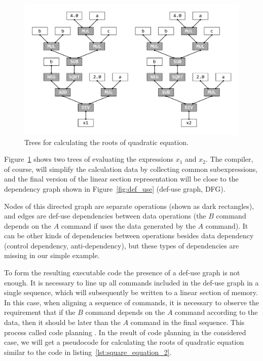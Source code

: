 \documentclass[
11pt,%
tightenlines,%
twoside,%
onecolumn,%
nofloats,%
nobibnotes,%
nofootinbib,%
superscriptaddress,%
noshowpacs,%
centertags]%
{revtex4}
\begin{document}
\begin{figure}[h]
\setcaptionmargin{5mm}
\includegraphics[width=1.05\textwidth]{pics/square_equation_calculation_tree.pdf}
\caption{Trees for calculating the roots of quadratic equation.}\label{fig:square_equation_calculation_tree}
\end{figure}

Figure~\ref{fig:square_equation_calculation_tree} shows two trees of evaluating the expressions $x_1$ and $x_2$.
The compiler, of course, will simplify the calculation data by collecting common subexpressions, and the final version of the linear section representation will be close to the dependency graph shown in Figure~\ref{fig:def_use} (def-use graph, DFG).

Nodes of this directed graph are separate operations (shown as dark rectangles), and edges are def-use dependencies between data operations (the $B$ command depends on the $A$ command if uses the data generated by the $A$ command).
It can be other kinds of dependencies between operations besides data dependency (control dependency, anti-dependency), but these types of dependencies are missing in our simple example.

To form the resulting executable code the presence of a def-use graph is not enough.
It is necessary to line up all commands included in the def-use graph in a single sequence, which will subsequently be written to a linear section of memory.
In this case, when aligning a sequence of commands, it is necessary to observe the requirement that if the $B$ command depends on the $A$ command according to the data, then it should be later than the $A$ command in the final sequence.
This process called code planning \cite{Aho}.
In the result of code planning in the considered case, we will get a pseudocode for calculating the roots of quadratic equation similar to the code in listing~\ref{lst:square_equation_2}.
\end{document}
